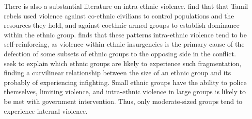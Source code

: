\documentclass[12pt,]{book}
\begin{document}
There is also a substantial literature on intra-ethnic violence.
\citet{Lilja2011} find that that Tamil rebels used violence against
co-ethnic civilians to control populations and the resources they hold,
and against coethnic armed groups to establish dominance within the
ethnic group. \citet{Staniland2012d} finds that these patterns
intra-ethnic violence tend to be self-reinforcing, as violence within
ethnic insurgencies is the primary cause of the defection of some
subsets of ethnic groups to the opposing side in the conflict.
\citep{Warren2015} seek to explain which ethnic groups are likely to
experience such fragmentation, finding a curvilinear relationship
between the size of an ethnic group and its probably of experiencing
infighting. Small ethnic groups have the ability to police themselves,
limiting violence, and intra-ethnic violence in large groups is likely
to be met with government intervention. Thus, only moderate-sized groups
tend to experience internal violence.
\end{document}
